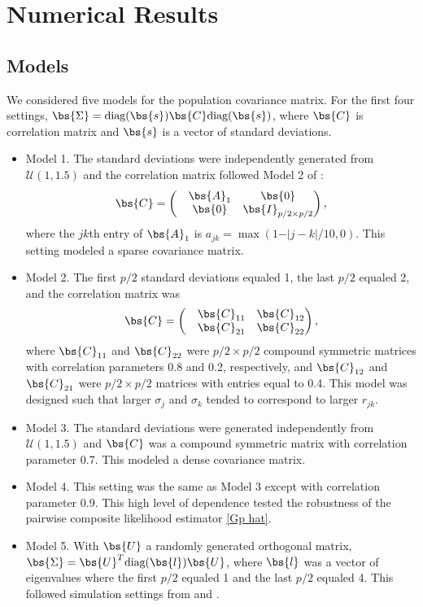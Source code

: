 \section{\label{numerical results}Numerical Results}
\subsection{\label{models}Models}

We considered five models for the population covariance matrix. For the first four settings, $\bs{\Sigma} = \text{diag}(\bs{s}) \bs{C} \text{diag}(\bs{s})$, where $\bs{C}$ is correlation matrix and $\bs{s}$ is a vector of standard deviations.
\begin{itemize}
\item Model 1. The standard deviations were independently generated from $\mathcal{U}(1,1.5)$ and the correlation matrix followed Model 2 of \citet{cai2011adaptive}:
  \[
  \bs{C}=
  \begin{pmatrix}&\bs{A}_1 & \bs{0} \\ &\bs{0} &\bs{I}_{p/2\times p/2}\end{pmatrix},
  \]
  where the $jk$th entry of $\bs{A}_1$ is $a_{jk} = \max(1- \vert j - k \vert / 10, 0)$. This setting modeled a sparse covariance matrix.
  
\item Model 2. The first $p / 2$ standard deviations equaled 1, the last $p / 2$ equaled 2, and the correlation matrix was
  \[
  \bs{C} = \begin{pmatrix} & \bs{C}_{11} & \bs{C}_{12} \\  & \bs{C}_{21} & \bs{C}_{22}\end{pmatrix},
  \]
  where $\bs{C}_{11}$ and $\bs{C}_{22}$ were $p/2 \times p/2$ compound symmetric matrices with correlation parameters 0.8 and 0.2, respectively, and $\bs{C}_{12}$ and $\bs{C}_{21}$ were $p/2 \times p/2$ matrices with entries equal to 0.4. This model was designed such that larger $\sigma_j$ and $\sigma_k$ tended to correspond to larger $r_{jk}$.
  
\item Model 3. The standard deviations were generated independently from $\mathcal{U}(1, 1.5)$ and $\bs{C}$ was a compound symmetric matrix with correlation parameter 0.7. This modeled a dense covariance matrix.
  
\item Model 4. This setting was the same as Model 3 except with correlation parameter 0.9. This high level of dependence tested the robustness of the pairwise composite likelihood estimator \eqref{Gp hat}.
  
\item Model 5. With $\bs{U}$ a randomly generated orthogonal matrix, $\bs{\Sigma} = \bs{U}^T\text{diag}(\bs{l})\bs{U}$, where $\bs{l}$ was a vector of eigenvalues where the first $p / 2$ equaled 1 and the last $p / 2$ equaled 4. This followed simulation settings from \citet{lam2016nonparametric} and \citet{ledoit2019quadratic}.
\end{itemize}

